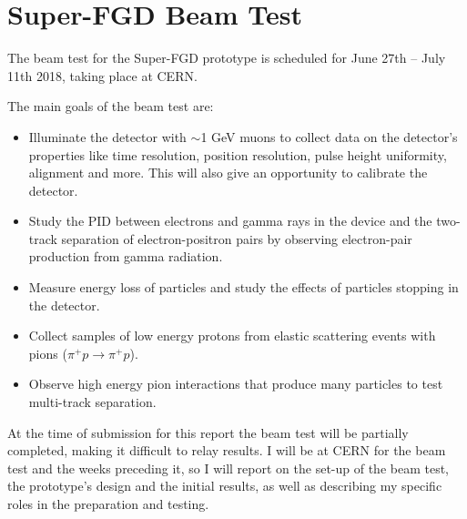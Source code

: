 \documentclass[aps,pra,12pt,notitlepage,tightenlines]{revtex4-1}
\begin{document}
\section{Super-FGD Beam Test}
\label{sec:fgd}
The beam test for the Super-FGD prototype is scheduled for June 27th -- July 11th 2018, taking place at CERN.

The main goals of the beam test are:
\begin{itemize}
 \item Illuminate the detector with $\sim$1 GeV muons to collect data on the detector's properties like time resolution, position resolution, pulse height uniformity, alignment and more. This will also give an opportunity to calibrate the detector.
 \item Study the PID between electrons and gamma rays in the device and the two-track separation of electron-positron pairs by observing electron-pair production from gamma radiation.
 \item Measure energy loss of particles and study the effects of particles stopping in the detector.
 \item Collect samples of low energy protons from elastic scattering events with pions ($\pi^+ p \rightarrow \pi^+ p$).
 \item Observe high energy pion interactions that produce many particles to test multi-track separation.
\end{itemize}

At the time of submission for this report the beam test will be partially completed, making it difficult to relay results. I will be at CERN for the beam test and the weeks preceding it, so I will report on the set-up of the beam test, the prototype's design and the initial results, as well as describing my specific roles in the preparation and testing.
\end{document}
